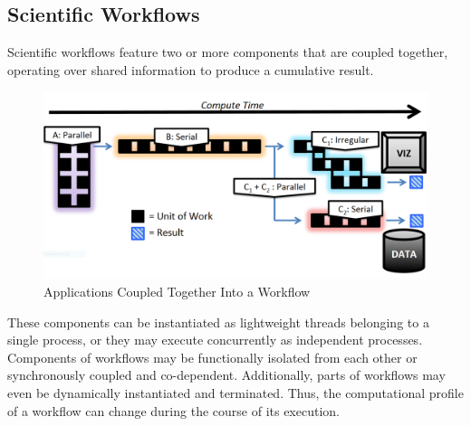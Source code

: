 \subsection{Scientific Workflows} %
%
Scientific workflows feature two or more components that are coupled
together, operating over shared information to produce a cumulative
result.
%
\begin{figure}[h]
\centering
\includegraphics[width=\columnwidth]{images/workflow_example.png}
\caption{Applications Coupled Together Into a Workflow}
\label{fig_workflow_example}
\end{figure}
%
These components can be instantiated as lightweight threads belonging
to a single process, or they may execute concurrently as independent
processes.
%
Components of workflows may be functionally isolated from each
other or synchronously coupled and co-dependent.
%
Additionally, parts of workflows may even be dynamically instantiated and
terminated.
%
Thus, the computational profile of a workflow can change during the course
of its execution.
%
%
\par
%
%
%
%
%
